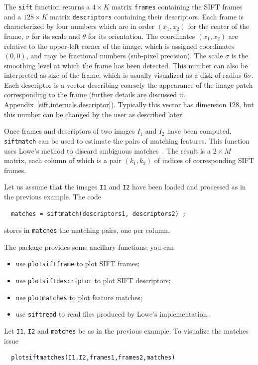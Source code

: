\documentclass{article}
\let\oldtt=\tt
\renewcommand{\tt}{\oldtt\color{codecolor}}
\begin{document}
The {\tt sift} function returns a $4\times K$ matrix {\tt frames} containing the SIFT frames and a $128 \times K$ matrix {\tt descriptors} containing their descriptors. Each frame is characterized by four numbers which are in order $(x_1,x_2)$ for the center of the frame, $\sigma$ for its scale and $\theta$ for its orientation. The coordinates $(x_1,x_2)$ are relative to the upper-left corner of the image, which is assigned coordinates $(0,0)$, and may be fractional numbers (sub-pixel precision). The scale $\sigma$ is the smoothing level at which the frame has been detected. This number can also be interpreted as size of the frame, which is usually visualized as a disk of radius $6\sigma$. Each descriptor is a vector describing coarsely the appearance of the image patch corresponding to the frame (further details are discussed in Appendix~\ref{sift.internals.descriptor}). Typically this vector has dimension 128, but this number can be changed by the user as described later.

Once frames and descriptors of two images $I_1$ and $I_2$ have been computed, {\tt siftmatch} can be used to estimate the pairs of matching features. This function uses Lowe's method to discard ambiguous matches~\cite{lowe04distinctive}. The result is a $2\times M$ matrix,  each column of which is a pair $(k_1,k_2)$ of indices of corresponding SIFT frames.
\begin{example}[Matching]
Let us assume that the images {\tt I1} and {\tt I2} have been loaded and processed as in the previous example. The code
\begin{verbatim}
  matches = siftmatch(descriptors1, descriptors2) ;
\end{verbatim}
stores in {\tt matches} the matching pairs, one per column.
\end{example}

The package provides some ancillary functions; you can
\begin{itemize}
\item use {\tt plotsiftframe} to plot SIFT frames;
\item use {\tt plotsiftdescriptor} to plot SIFT descriptors;
\item use {\tt plotmatches} to plot feature matches;
\item use {\tt siftread} to read files produced by Lowe's implementation.
\end{itemize}

\begin{example}[Visualization]
Let {\tt I1}, {\tt I2} and {\tt matches} be as in the previous example. To visualize the matches issue
\begin{verbatim}
  plotsiftmatches(I1,I2,frames1,frames2,matches)
\end{verbatim}
\end{example}
\end{document}
